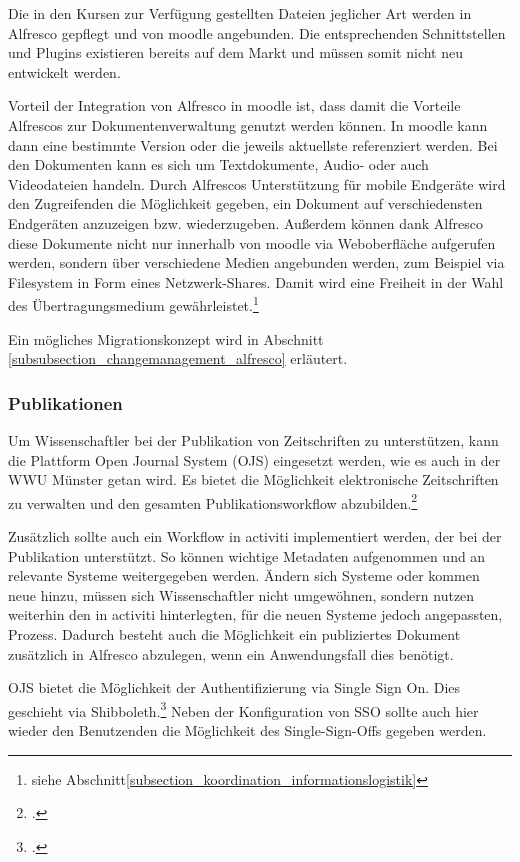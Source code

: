 Die in den Kursen zur Verfügung gestellten Dateien jeglicher Art werden in Alfresco gepflegt und von moodle angebunden. Die entsprechenden Schnittstellen und Plugins existieren bereits auf dem Markt und müssen somit nicht neu entwickelt werden.

Vorteil der Integration von Alfresco in moodle ist, dass damit die Vorteile Alfrescos zur Dokumentenverwaltung genutzt werden können. In moodle kann dann eine bestimmte Version oder die jeweils aktuellste referenziert werden. Bei den Dokumenten kann es sich um Textdokumente, Audio- oder auch Videodateien handeln. Durch Alfrescos Unterstützung für mobile Endgeräte wird den Zugreifenden die Möglichkeit gegeben, ein Dokument auf verschiedensten Endgeräten anzuzeigen bzw. wiederzugeben. Außerdem können dank Alfresco diese Dokumente nicht nur innerhalb von moodle via Weboberfläche aufgerufen werden, sondern über verschiedene Medien angebunden werden, zum Beispiel via Filesystem in Form eines Netzwerk-Shares. 
Damit wird eine Freiheit in der Wahl des Übertragungsmedium gewährleistet.\footnote{siehe Abschnitt\ref{subsection_koordination_informationslogistik}}

Ein mögliches Migrationskonzept wird in Abschnitt \ref{subsubsection_changemanagement_alfresco} erläutert.

\subsubsection{Publikationen}
Um Wissenschaftler bei der Publikation von Zeitschriften zu unterstützen, kann die Plattform Open Journal System (OJS) eingesetzt werden, wie es auch in der WWU Münster getan wird. Es bietet die Möglichkeit elektronische Zeitschriften zu verwalten und den gesamten Publikationsworkflow abzubilden.\footcite[Vgl.][48]{vogl_fortschritte_2012}

Zusätzlich sollte auch ein Workflow in activiti implementiert werden, der bei der Publikation unterstützt. So können wichtige Metadaten aufgenommen und an relevante Systeme weitergegeben werden. Ändern sich Systeme oder kommen neue hinzu, müssen sich Wissenschaftler nicht umgewöhnen, sondern nutzen weiterhin den in activiti hinterlegten, für die neuen Systeme jedoch angepassten, Prozess. Dadurch besteht auch die Möglichkeit ein publiziertes Dokument zusätzlich in Alfresco abzulegen, wenn ein Anwendungsfall dies benötigt.

OJS bietet die Möglichkeit der Authentifizierung via Single Sign On. Dies geschieht via Shibboleth.\footcite{ojs_setup_sso} 
Neben der Konfiguration von SSO sollte auch hier wieder den Benutzenden die Möglichkeit des Single-Sign-Offs gegeben werden.

